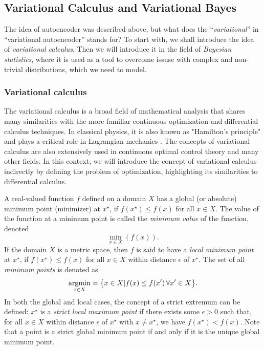 \subsection{Variational Calculus and Variational Bayes}
\label{subsec:variational-bayes}
The idea of autoencoder was described above, but what does the ``\textit{variational}'' in ``variational autoencoder'' stands for? 
To start with, we shall introduce the idea of \textit{variational calculus}. Then we will introduce it in the field of 
\textit{Bayesian statistics}, where it is used as a tool to overcome issuse with complex and non-trivial distributions, which we need to model.  
\subsubsection*{Variational calculus}
The variational calculus is a broad field of mathematical analysis that shares many similarities with the more familiar continuous optimization
and differential calculus techniques. In classical physics, it is also known as "Hamilton's principle" and plays a critical role in Lagrangian
mechanics \cite{lagrangian-mechanics-1998,kulhanek-2016}. The concepts of variational calculus are also extensively used in continuous optimal
control theory \cite{optimal-control-2004} and many other fields.  In this context, we will introduce the concept of variational calculus 
indirectly by defining the problem of optimization, highlighting its similarities to differential calculus.

A real-valued function $f$ defined on a domain $X$ has a global (or absolute) minimum point (minimizer) at $x^\star$, 
if $f(x^\star) \leq f(x)$ for all $x \in X$. The value of the function at a minimum point is called the \textit{minimum value} of 
the function, denoted 
$$
\min_{x \in X}(f(x)).
$$ 
If the domain $X$ is a metric space, then $f$ is said to have a \textit{local minimum point} at $x^\star$, 
if $f(x^\star) \leq f(x)$ for all $x \in X$ within distance $\epsilon$ of $x^\star$.
The set of all \textit{minimum points} is denoted as
$$
\mathop{\rm argmin}_{x\in X} = \big\{x\in X | f(x) \leq f(x^\prime)\, \forall x^\prime \in X \big\}.
$$ 
In both the global and local cases, the concept of a strict extremum can be defined: $x^\star$ is a \textit{strict local maximum point} if 
there exists some $\epsilon > 0$ such that, for all $x \in X$ within distance $\epsilon$ of $x^\star$ with $x \neq x^\star$, we have 
$f(x^\star) < f(x)$. Note that a point is a strict global minimum point if and only if it is the unique global minimum point. 

